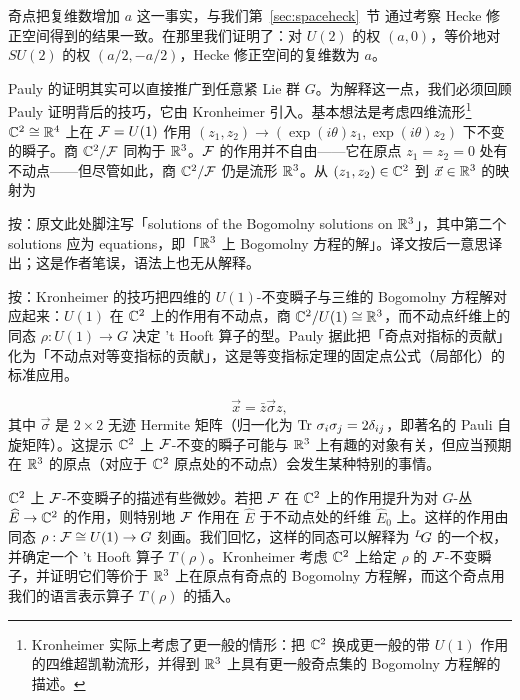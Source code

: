 奇点把复维数增加 $a$ 这一事实，与我们第~\ref{sec:spaceheck}~节 通过考察 Hecke 修正空间得到的结果一致。在那里我们证明了：对 $U(2)$ 的权 $(a,0)$，等价地对 $SU(2)$ 的权 $(a/2,-a/2)$，Hecke 修正空间的复维数为 $a$。

Pauly 的证明其实可以直接推广到任意紧 Lie 群 $G$。为解释这一点，我们必须回顾 Pauly 证明背后的技巧，它由 Kronheimer \cite{ref110} 引入。基本想法是考虑四维流形\footnote{Kronheimer 实际上考虑了更一般的情形：把 $\Bbb{C}^2$ 换成更一般的带 $U(1)$ 作用的四维超凯勒流形，并得到 $\Bbb{R}^3$ 上具有更一般奇点集的 Bogomolny 方程解的描述。} $\Bbb{C}^2\cong \Bbb{R}^4$ 上在 ${\EUF}=U(1)$ 作用 $(z_1,z_2)\to (\exp(i\theta)z_1,\exp(i\theta)z_2)$ 下不变的瞬子。商 $\Bbb{C}^2/{\EUF}$ 同构于 $\Bbb{R}^3$。${\EUF}$ 的作用并不自由——它在原点 $z_1=z_2=0$ 处有不动点——但尽管如此，商 $\Bbb{C}^2/{\EUF}$ 仍是流形 $\Bbb{R}^3$。从 $(z_1,z_2)\in \Bbb{C}^2$ 到 $\vec x\in \Bbb{R}^3$ 的映射为

\begin{yizhu}[原文疑误]
按：原文此处脚注写「solutions of the Bogomolny solutions on $\Bbb{R}^3$」，其中第二个 solutions 应为 equations，即「$\Bbb{R}^3$ 上 Bogomolny 方程的解」。译文按后一意思译出；这是作者笔误，语法上也无从解释。
\end{yizhu}

\begin{yizhu}[物理图像]
按：Kronheimer 的技巧把四维的 $U(1)$-不变瞬子与三维的 Bogomolny 方程解对应起来：$U(1)$ 在 $\Bbb{C}^2$ 上的作用有不动点，商 $\Bbb{C}^2/U(1)\cong\Bbb{R}^3$，而不动点纤维上的同态 $\rho:U(1)\to G$ 决定 't Hooft 算子的型。Pauly 据此把「奇点对指标的贡献」化为「不动点对等变指标的贡献」，这是等变指标定理的固定点公式（局部化）的标准应用。
\end{yizhu}
\setcounter{equation}{2}
\begin{equation}\label{eq:nigo}
\vec x=\bar z\vec\sigma z,
\end{equation}
其中 $\vec\sigma$ 是 $2\times 2$ 无迹 Hermite 矩阵（归一化为 $\Tr\,\sigma_i\sigma_j=2\delta_{ij}$，即著名的 Pauli 自旋矩阵）。这提示 $\Bbb{C}^2$ 上 ${\EUF}$-不变的瞬子可能与 $\Bbb{R}^3$ 上有趣的对象有关，但应当预期在 $\Bbb{R}^3$ 的原点（对应于 $\Bbb{C}^2$ 原点处的不动点）会发生某种特别的事情。

$\Bbb{C}^2$ 上 ${\EUF}$-不变瞬子的描述有些微妙。若把 ${\EUF}$ 在 $\Bbb{C}^2$ 上的作用提升为对 $G$-丛 $\hat E\to \Bbb{C}^2$ 的作用，则特别地 ${\EUF}$ 作用在 $\hat E$ 于不动点处的纤维 $\hat E_{0}$ 上。这样的作用由同态 $\rho:{\EUF}\cong U(1)\to G$ 刻画。我们回忆，这样的同态可以解释为 $^L\negthinspace G$ 的一个权，并确定一个 't Hooft 算子 $T(\rho)$。Kronheimer 考虑 $\Bbb{C}^2$ 上给定 $\rho$ 的 ${\EUF}$-不变瞬子，并证明它们等价于 $\Bbb{R}^3$ 上在原点有奇点的 Bogomolny 方程解，而这个奇点用我们的语言表示算子 $T(\rho)$ 的插入。

